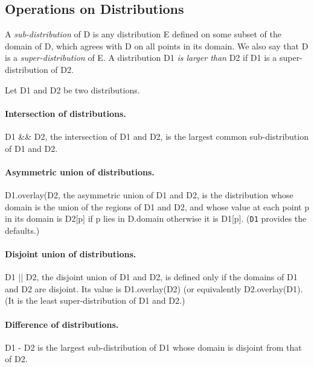 \subsection{Operations on Distributions}

A {\em sub-distribution} of {\cf D} is any
distribution {\cf E} defined on some subset of the domain of {\cf D},
which agrees with {\cf D} on all points in its domain. We also say
that {\cf D} is a {\em super-distribution} of {\cf E}. A distribution
{\cf D1} {\em is larger than} {\cf D2} if {\cf D1} is a
super-distribution of {\cf D2}.

Let {\cf D1} and {\cf D2} be two distributions.  


\paragraph{Intersection of distributions.}
{\cf D1 \&\& D2}, the intersection of {\cf D1} and {\cf D2}, is the
largest common sub-distribution of {\cf D1} and {\cf D2}.

\paragraph{Asymmetric union of distributions.}
{\cf D1.overlay(D2}, the asymmetric union of {\cf D1} and {\cf D2}, is the
distribution whose domain is the union of the regions of {\cf D1} and
{\cf D2}, and whose value at each point {\cf p} in its domain is {\cf D2[p]}
if {\cf p} lies in {\cf D.domain} otherwise it is {\cf D1[p]}. ({\tt D1} provides the defaults.)

\paragraph{Disjoint union of distributions.}
{\cf D1 || D2}, the disjoint union of {\cf D1} and {\cf D2}, is
defined only if the domains of {\cf D1} and {\cf D2} are disjoint. Its
value is {\cf D1.overlay(D2)} (or equivalently {\cf D2.overlay(D1)}.
(It is the least super-distribution of {\cf D1} and {\cf D2}.)

\paragraph{Difference of distributions.}
{\cf D1 - D2} is the largest sub-distribution of {\cf D1} whose domain is
disjoint from that of {\cf D2}.


